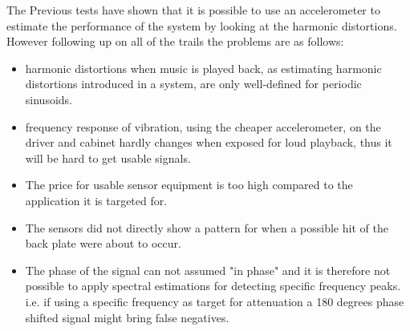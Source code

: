 


%



%

%





The Previous tests have shown that it is possible to use an accelerometer to estimate the performance of the system by looking at the harmonic distortions. However following up on all of the trails the problems are as follows:
\begin{itemize}
\item harmonic distortions when music is played back, as estimating harmonic distortions introduced in a system, are only well-defined for periodic sinusoids.
\item frequency response of vibration, using the cheaper accelerometer, on the driver and cabinet hardly changes when exposed for loud playback, thus it will be hard to get usable signals.
\item The price for usable sensor equipment is too high compared to the application it is targeted for. 
\item The sensors did not directly show a pattern for when a possible hit of the back plate were about to occur.
\item The phase of the signal can not assumed "in phase" and it is therefore not possible to apply spectral estimations for detecting specific frequency peaks. i.e. if using a specific frequency as target for attenuation a 180 degrees phase shifted signal might bring false negatives. 
\end{itemize}

